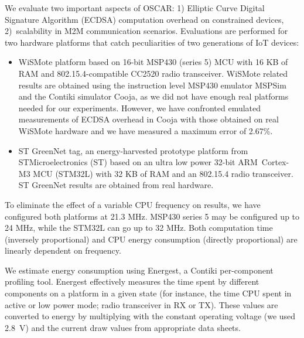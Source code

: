 \documentclass[conference]{IEEEtran}
\begin{document}
We evaluate two important aspects of OSCAR: 1) Elliptic Curve Digital Signature
Algorithm (ECDSA) computation overhead on constrained devices, 2)~scalability in M2M communication scenarios. Evaluations are performed for two hardware platforms that catch peculiarities of two generations of IoT devices:
\begin{itemize}
\item WiSMote platform based on 16-bit MSP430 (series 5) MCU with 16 KB of RAM
  and 802.15.4-compatible CC2520 radio transceiver. WiSMote related results are
  obtained using the instruction level MSP430 emulator MSPSim and the Contiki
  simulator Cooja, as we did not have enough real platforms needed for our
  experiments. However, we have confronted emulated measurements of ECDSA
  overhead in Cooja with those obtained on real WiSMote hardware and we have measured a maximum error of 2.67\%. 
\item ST GreenNet tag, an energy-harvested prototype platform from STMicroelectronics (ST) based on an ultra low power 32-bit ARM~Cortex-M3 MCU (STM32L) with 32 KB of RAM and an 802.15.4 radio transceiver. ST GreenNet results are obtained from real hardware.
\end{itemize} 

To eliminate the effect of a variable CPU frequency on results, we have configured both platforms at 21.3 MHz. MSP430 series 5 may be configured up to 24 MHz, while the STM32L can go up to 32 MHz. Both computation time (inversely proportional) and CPU energy consumption (directly proportional) are linearly dependent on frequency.


We estimate energy consumption using Energest, a Contiki per-component profiling
tool. Energest effectively measures the time spent by  different components on a
platform in a given state (for instance, the time CPU spent in active or low
power mode; radio transceiver in RX or TX). These values are converted to energy by
multiplying with the constant operating voltage (we used 2.8~V) and the current draw values from appropriate data sheets. 
\end{document}
